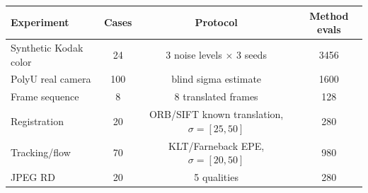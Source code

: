 \begin{tabular}{lccc}
\toprule
Experiment & Cases & Protocol & Method evals \\
\midrule
Synthetic Kodak color & 24 & 3 noise levels $\times$ 3 seeds & 3456 \\
PolyU real camera & 100 & blind sigma estimate & 1600 \\
Frame sequence & 8 & 8 translated frames & 128 \\
Registration & 20 & ORB/SIFT known translation, $\sigma=[25, 50]$ & 280 \\
Tracking/flow & 70 & KLT/Farneback EPE, $\sigma=[20, 50]$ & 980 \\
JPEG RD & 20 & 5 qualities & 280 \\
\bottomrule
\end{tabular}
